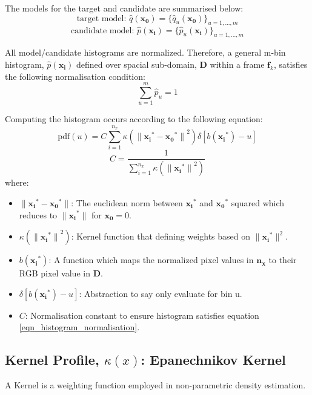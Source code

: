The models for the target and candidate are summarised below:
$$\text{target model: } \hat{q}(\mathbf{x_0})=\{\hat{q}_u(\mathbf{x_0})\}_{u=1,...,m}$$
$$\text{candidate model: } \hat{p}(\mathbf{x_i})=\{\hat{p}_u(\mathbf{x_i})\}_{u=1,...,m}$$

All model/candidate histograms are normalized. Therefore, a general m-bin
histogram, $\hat{p}(\mathbf{x_i})$ defined over spacial sub-domain, $\mathbf{D}$
within a frame $\mathbf{f}_k$, satisfies the following normalisation condition:
\begin{equation}\label{eqn_histogram_normalisation}
    \sum_{u=1}^{m}\hat{p}_u = 1
\end{equation}

Computing the histogram occurs according to the following equation:
\begin{equation}
    \text{pdf}(u)=C\sum_{i=1}^{n_x}\kappa({\parallel{\mathbf{x_i}^*}-{\mathbf{x_0}^*}\parallel}^2)\delta[b(\mathbf{x_i}^*)-u]    
\end{equation}
\begin{equation}
    C=\frac{1}{\sum_{i=1}^{n_x}\kappa({\parallel\mathbf{x_i}^*\parallel}^2)}
\end{equation}
where:
\begin{itemize}
    \item $\parallel{\mathbf{x_i}}^*-{\mathbf{x_0}}^*\parallel$: The euclidean
        norm between $\mathbf{x_i}^*$ and ${\mathbf{x_0}}^*$ squared which
        reduces to $\parallel{\mathbf{x_i}}^*\parallel$ for $\mathbf{x_0} = 0$. 
    \item $\kappa({\parallel{\mathbf{x_i}}^*\parallel}^2)$: Kernel function that
        defining weights based on $\parallel{\mathbf{x_i}}^*\parallel^2$.
    \item $b({\mathbf{x_i}}^*)$: A function which maps the normalized pixel
        values in $\mathbf{n_x}$ to their RGB pixel value in $\mathbf{D}$.
    \item $\delta[b({\mathbf{x_i}}^*)-u]$: Abstraction to say only evaluate for bin u.
    \item $C$: Normalisation constant to ensure histogram satisfies equation
        \ref{eqn_histogram_normalisation}.
\end{itemize}

\subsection{Kernel Profile, $\kappa(x)$: Epanechnikov Kernel}
A Kernel is a weighting function employed in non-parametric density estimation. 

